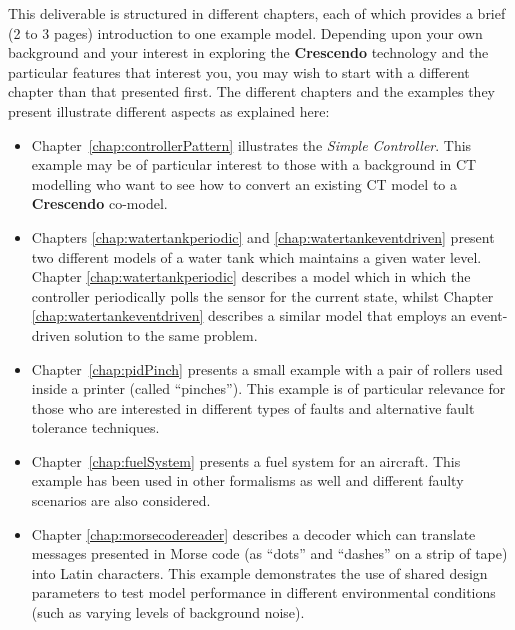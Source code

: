 \documentclass{crescendorepchap}
\newcommand{\DESTECS}{\textbf{Crescendo}\xspace}
\begin{document}
This deliverable is structured in different chapters, each of which
provides a brief (2 to 3 pages) introduction to one example model.
Depending upon your own background and your interest in exploring the
\DESTECS technology and the particular features that interest you, you
may wish to start with a different chapter than that presented first. The
different chapters and the examples they present illustrate different
aspects as explained here:

\begin{itemize}
\item Chapter~\ref{chap:controllerPattern} illustrates the
  \emph{Simple Controller}.  This example may be of particular
  interest to those with a background in CT modelling who want to see
  how to convert an existing CT model to a \DESTECS co-model.
\item Chapters \ref{chap:watertankperiodic} and
  \ref{chap:watertankeventdriven} present two different models of a
  water tank which maintains a given water level.  Chapter
  \ref{chap:watertankperiodic} describes a model which in which the
  controller periodically polls the sensor for the current state,
  whilst Chapter \ref{chap:watertankeventdriven} describes a similar
  model that employs an event-driven solution to the same problem.
\item Chapter~\ref{chap:pidPinch} presents a small example with a pair
  of rollers used inside a printer (called ``pinches''). This example
  is of particular relevance for those who are interested in different
  types of faults and alternative fault tolerance techniques.
\item Chapter~\ref{chap:fuelSystem} presents a fuel system for an
  aircraft. This example has been used in other formalisms as well and
  different faulty scenarios are also considered.
\item Chapter \ref{chap:morsecodereader} describes a decoder which can
  translate messages presented in Morse code (as ``dots'' and
  ``dashes'' on a strip of tape) into Latin characters.  This example
  demonstrates the use of shared design parameters to test model
  performance in different environmental conditions (such as varying
  levels of background noise).

\end{itemize}
\end{document}
